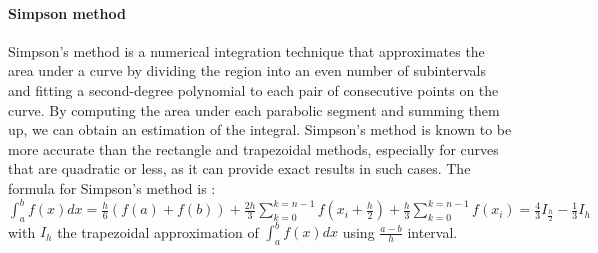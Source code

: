 \paragraph{Simpson method}
Simpson's method is a numerical integration technique that approximates the area under a curve by dividing the region into an even number of subintervals and fitting a second-degree polynomial to each pair of consecutive points on the curve. By computing the area under each parabolic segment and summing them up, we can obtain an estimation of the integral. Simpson's method is known to be more accurate than the rectangle and trapezoidal methods, especially for curves that are quadratic or less, as it can provide exact results in such cases. The formula for Simpson's method is : \\
$\int_{a}^{b}f(x)dx = \frac{h}{6}(f(a)+f(b)) +\frac{2h}{3}\sum_{k=0}^{k=n-1}f(x_{i} +\frac{h}{2})  + \frac{h}{3}\sum_{k=0}^{k=n-1} f(x_{i}) = \frac{4}{3}I_{\frac{h}{2}} - \frac{1}{3}I_{h} $ \\
with $I_{h}$ the trapezoidal approximation of $\int_{a}^{b}f(x)dx $ using $\frac{a-b}{h}$ interval.
 
